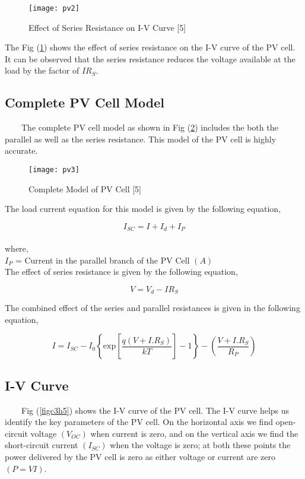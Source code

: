 {\begin{figure}[H]
\centering
\texttt{[image: pv2]}
\caption{Effect of Series Resistance on I-V Curve [5]}
\label{figc3h222} %
\end{figure}

The Fig (\ref{figc3h222}) shows the effect of series resistance on the I-V curve of the PV cell. It can be observed that the series resistance reduces the voltage available at the load by the factor of $IR_{S}$.

\subsection{Complete PV Cell Model}
\
\
\
\
The complete PV cell model as shown in Fig (\ref{figc3h333}) includes the both the parallel as well as the series resistance. This model of the PV cell is highly accurate.

\begin{figure}[H]
\centering
\texttt{[image: pv3]}
\caption{Complete Model of PV Cell [5]}
\label{figc3h333} %
\end{figure}

The load current equation for this model is given by the following equation,

\begin{equation}
\label{pv10}
I_{SC}=I+I_{d}+I_{P}
\end{equation}\\
where,\\
$ I_{P} $ = Current in the parallel branch of the PV Cell $ (A) $\\ 

The effect of series resistance is given by the following equation,

\begin{equation}
\label{pv11}
V=V_{d}-IR_{S}
\end{equation}

The combined effect of the series and parallel resistances is given in the following equation, 

\begin{equation}
\label{pv9}
I = I_{SC}-I_{0} \left\{\text{exp}\left[\frac{q(V+I.R_{S})}{kT} \right]-1 \right\}-\left(\frac{V+I.R_{S}}{R_{P}}\right)
\end{equation}

\subsection{I-V Curve}
\
\
\
\
Fig (\ref{figc3h5}) shows the I-V curve of the PV cell. The I-V curve helps us identify the key parameters of the PV cell. On the horizontal axis we find open-circuit voltage $(V_{OC})$ when current is zero, and on the vertical axis we find the short-circuit current $(I_{SC})$ when the voltage is zero; at both these points the power delivered by the PV cell is zero as either voltage or current are zero $(P=VI)$.

}
